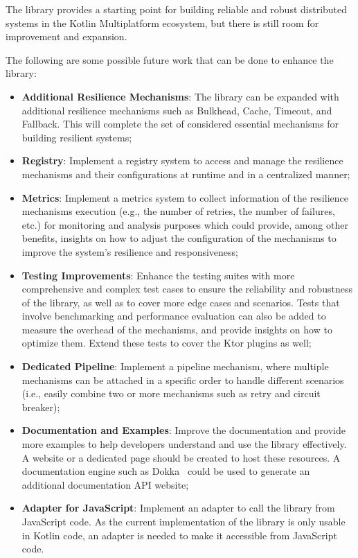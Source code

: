 The library provides a starting point for building reliable and robust distributed systems in the Kotlin Multiplatform ecosystem, but there is still room for improvement and expansion.

The following are some possible future work that can be done to enhance the library:

\begin{itemize}
    \item \textbf{Additional Resilience Mechanisms}:
    The library can be expanded with additional resilience mechanisms such as Bulkhead,
    Cache, Timeout, and Fallback.
    This will complete the set of considered essential mechanisms for building resilient systems;
    \item \textbf{Registry}:
    Implement a registry system
    to access and manage the resilience mechanisms and their configurations at runtime and in a centralized manner;
    \item \textbf{Metrics}:
    Implement a metrics system to collect information of the resilience mechanisms execution (e.g., the number of retries, the number of failures, etc.) for monitoring and analysis purposes which could provide, among other benefits, insights on how to adjust the configuration of the mechanisms to improve the system's resilience and responsiveness;
    \item \textbf{Testing Improvements}:
    Enhance the testing suites with more comprehensive and complex test cases
    to ensure the reliability and robustness of the library, as well as to cover more edge cases and scenarios.
    Tests that involve benchmarking and performance evaluation can also be added to measure the overhead of the mechanisms,
    and provide insights on how to optimize them.
    Extend these tests to cover the Ktor plugins as well;
    \item \textbf{Dedicated Pipeline}:
    Implement a pipeline mechanism,
    where multiple mechanisms can be attached in a specific order to handle different scenarios (i.e., easily combine two or more mechanisms such as retry and circuit breaker);
    \item \textbf{Documentation and Examples}:
    Improve the documentation
    and provide more examples to help developers understand and use the library effectively.
    A website or a dedicated page should be created
    to host these resources.
    A documentation engine such as Dokka~\cite{dokka} could be used to generate an additional documentation API website;
    \item \textbf{Adapter for JavaScript}: Implement an adapter to call the library from JavaScript code.
    As the current implementation of the library is only usable in Kotlin code, an adapter is needed to make it accessible from JavaScript code.
\end{itemize}

